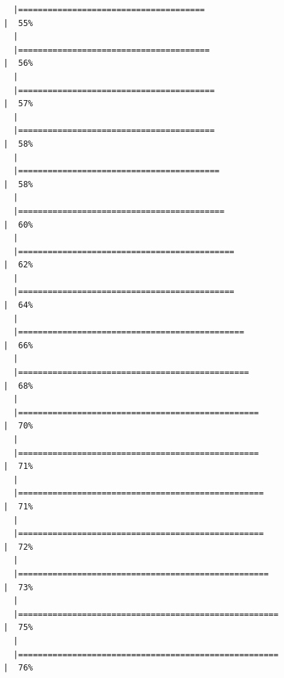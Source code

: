 \documentclass[
  letterpaper,
  DIV=11,
  numbers=noendperiod]{scrreprt}
\begin{document}
\begin{verbatim}
  |======================================                                |  55%
  |                                                                            
  |=======================================                               |  56%
  |                                                                            
  |========================================                              |  57%
  |                                                                            
  |========================================                              |  58%
  |                                                                            
  |=========================================                             |  58%
  |                                                                            
  |==========================================                            |  60%
  |                                                                            
  |============================================                          |  62%
  |                                                                            
  |============================================                          |  64%
  |                                                                            
  |==============================================                        |  66%
  |                                                                            
  |===============================================                       |  68%
  |                                                                            
  |=================================================                     |  70%
  |                                                                            
  |=================================================                     |  71%
  |                                                                            
  |==================================================                    |  71%
  |                                                                            
  |==================================================                    |  72%
  |                                                                            
  |===================================================                   |  73%
  |                                                                            
  |=====================================================                 |  75%
  |                                                                            
  |=====================================================                 |  76%

\end{verbatim}
\end{document}
